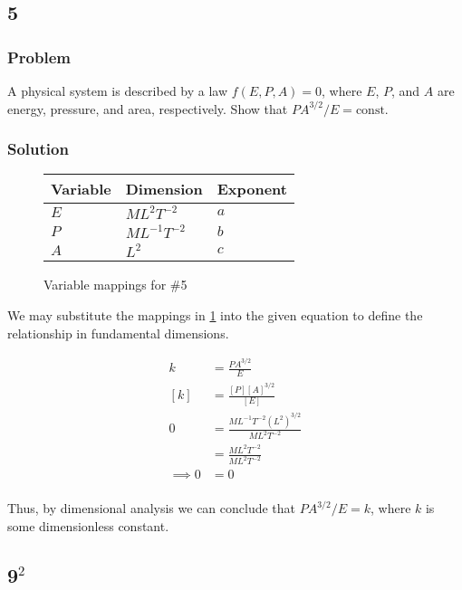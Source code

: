 \documentclass[12pt]{article}
\begin{document}
\subsection{5}
  \subsubsection*{Problem}
  A physical system is described by a law $f(E,P,A)=0$, where $E$, $P$, and $A$
  are energy, pressure, and area, respectively. Show that $PA^{3/2}/E=\text{const}$.

  \subsubsection*{Solution}
  \begin{figure}
    \centering
    \begin{tabularx}{0.5\textwidth}{XXX}
      Variable & Dimension & Exponent \\ \midrule
      $E$ & $ML^2T^{-2}$ & $a$ \\
      $P$ & $ML^{-1}T^{-2}$ & $b$ \\
      $A$ & $L^2$ & $c$ \\
    \end{tabularx}
    \caption{Variable mappings for \#5}
\label{fig:5-var-mappings}
  \end{figure}

  We may substitute the mappings in \cref{fig:5-var-mappings} into the given
  equation to define the relationship in fundamental dimensions.

  \begin{equation}
    \label{eq:5-substitution}
    \boxed{
    \begin{aligned}
      k &= \frac{PA^{3/2}}{E} \\
      [k] &= \frac{[P]{[A]}^{3/2}}{[E]} \\
      0 &= \frac{ML^{-1}T^{-2}{(L^2)}^{3/2}}{ML^2T^{-2}} \\
      &= \frac{ML^2T^{-2}}{ML^2T^{-2}} \\
      \implies 0 &= 0 \\
    \end{aligned}
    }
  \end{equation}

  Thus, by dimensional analysis we can conclude that $PA^{3/2}/E=k$, where $k$
  is some dimensionless constant.

  \newpage
\subsection{9$^2$}
\end{document}
